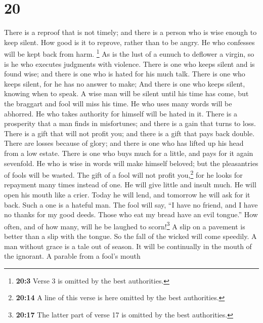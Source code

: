 \hypertarget{section-16}{%
\section{20}\label{section-16}}

 There is a reproof that is not timely; and there is a
person who is wise enough to keep silent.  How good is it
to reprove, rather than to be angry. He who confesses will be kept back
from harm.  \footnote{\textbf{20:3} Verse 3 is omitted by
  the best authorities.}  As is the lust of a eunuch to
deflower a virgin, so is he who executes judgments with violence.
 There is one who keeps silent and is found wise; and
there is one who is hated for his much talk.  There is one
who keeps silent, for he has no answer to make; And there is one who
keeps silent, knowing when to speak.  A wise man will be
silent until his time has come, but the braggart and fool will miss his
time.  He who uses many words will be abhorred. He who
takes authority for himself will be hated in it.  There is
a prosperity that a man finds in misfortunes; and there is a gain that
turns to loss.  There is a gift that will not profit you;
and there is a gift that pays back double.  There are
losses because of glory; and there is one who has lifted up his head
from a low estate.  There is one who buys much for a
little, and pays for it again sevenfold.  He who is wise
in words will make himself beloved; but the pleasantries of fools will
be wasted.  The gift of a fool will not profit
you,\footnote{\textbf{20:14} A line of this verse is here omitted by the
  best authorities.} for he looks for repayment many times instead of
one.  He will give little and insult much. He will open
his mouth like a crier. Today he will lend, and tomorrow he will ask for
it back. Such a one is a hateful man.  The fool will say,
``I have no friend, and I have no thanks for my good deeds. Those who
eat my bread have an evil tongue.''  How often, and of
how many, will he be laughed to scorn!\footnote{\textbf{20:17} The
  latter part of verse 17 is omitted by the best authorities.}
 A slip on a pavement is better than a slip with the
tongue. So the fall of the wicked will come speedily.  A
man without grace is a tale out of season. It will be continually in the
mouth of the ignorant.  A parable from a fool's mouth
